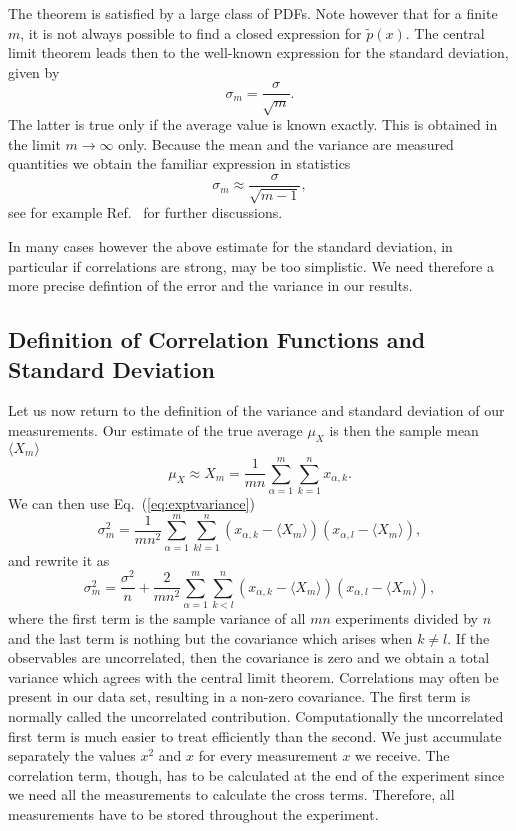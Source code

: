 The theorem is satisfied by a large class of PDFs. Note however that for a
finite $m$, it is not always possible to find a closed expression for
$\tilde{p}(x)$.
The central limit theorem leads then to the well-known expression for the
standard deviation, given by 
\[
    \sigma_m=
\frac{\sigma}{\sqrt{m}}.
\]
The latter is true only if the average value is known exactly. This is obtained in the limit
$m\rightarrow \infty$  only. Because the mean and the variance are measured quantities we obtain 
the familiar expression in statistics
\[
    \sigma_m\approx 
\frac{\sigma}{\sqrt{m-1}},
\]  
see for example Ref.~\cite{rice} for further discussions.

In many cases however the above estimate for the standard deviation, in particular if correlations are strong, may be too simplistic.  We need therefore a more precise defintion of the error and the variance in our results.

\subsection{Definition of Correlation Functions and Standard Deviation}

Let us now return to the definition of the variance 
and standard deviation of our measurements.
Our estimate of the true average $\mu_{X}$ is then the sample mean $\langle X_m \rangle$
\[
\mu_{X}^{\phantom X} \approx X_m=\frac{1}{mn}\sum_{\alpha=1}^m\sum_{k=1}^n x_{\alpha,k}.
\]
We can then use Eq.~(\ref{eq:exptvariance})
\[
\sigma^2_m=\frac{1}{mn^2}\sum_{\alpha=1}^m\sum_{kl=1}^n (x_{\alpha,k}-\langle X_m \rangle)(x_{\alpha,l}-\langle X_m \rangle),
\]
and rewrite it as 
\[
\sigma^2_m=\frac{\sigma^2}{n}+\frac{2}{mn^2}\sum_{\alpha=1}^m\sum_{k<l}^n (x_{\alpha,k}-\langle X_m \rangle)(x_{\alpha,l}-\langle X_m \rangle),
\]
where the first term is the sample variance of all $mn$ experiments divided by $n$
and the last term is nothing but the covariance which arises when $k\ne l$. If the 
observables are uncorrelated, then the covariance is zero and we obtain a total variance
which agrees with the central limit theorem. Correlations may often be present in our data set, resulting in a non-zero covariance.  The first term is normally called the uncorrelated 
contribution.
Computationally the uncorrelated first term is much easier to treat
efficiently than the second.
We just accumulate separately the values $x^2$ and $x$ for every
measurement $x$ we receive. The correlation term, though, has to be
calculated at the end of the experiment since we need all the
measurements to calculate the cross terms. Therefore, all measurements
have to be stored throughout the experiment.

